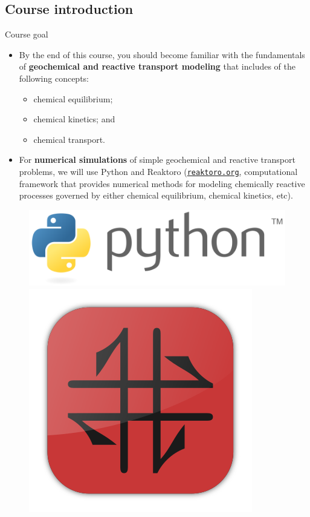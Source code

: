 \subsection[Course introduction]{Course introduction}

\begin{frame}{Course goal}
\vskip 10pt
\begin{itemize}
\item By the end of this course, you should become familiar with the fundamentals
of \textbf{geochemical and reactive transport modeling} that includes of the following concepts: 
\begin{itemize}
\item chemical equilibrium;
\item chemical kinetics; and
\item chemical transport.
\end{itemize}
\pause
\item For \textbf{numerical simulations} of simple geochemical and reactive transport problems, 
we will use Python and Reaktoro (\href{https://reaktoro.org/}{\textcolor{indigo(dye)}{\tt reaktoro.org}}, computational framework that provides numerical methods for modeling chemically reactive processes governed by either chemical equilibrium, chemical kinetics, etc).
\end{itemize}

\begin{figure}
\centering
\includegraphics[height=0.15\columnwidth]{figures/intro/logo-python.png}
\includegraphics[height=0.15\columnwidth]{figures/intro/logo-reaktoro.png}
\end{figure}

\end{frame}

